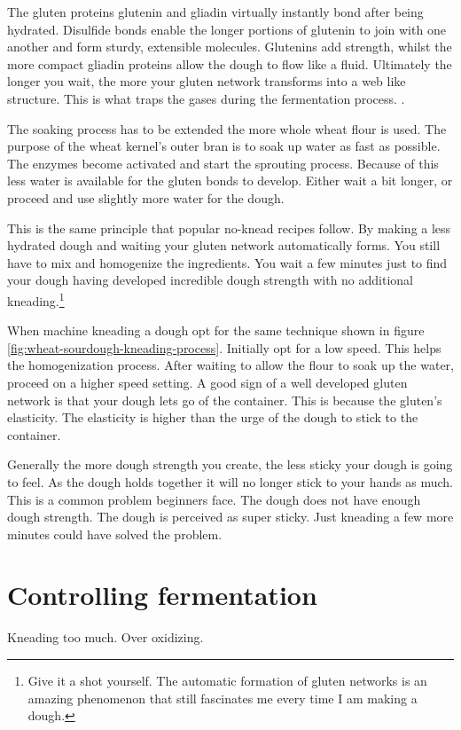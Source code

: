 The gluten proteins glutenin and gliadin virtually instantly bond after being
hydrated. Disulfide bonds enable the longer portions of
glutenin to join with one another and form sturdy, extensible molecules.
Glutenins add strength, whilst the more compact gliadin proteins allow
the dough to flow like a fluid. Ultimately the longer you wait, the more
your gluten network transforms into a web like structure. This is what
traps the gases during the fermentation process. \cite{how+does+gluten+work}.

The soaking process has to be extended the more whole wheat flour is used.
The purpose of the wheat kernel's outer bran is to soak up water as fast
as possible. The enzymes become activated and start the sprouting process.
Because of this less water is available for the gluten bonds to develop.
Either wait a bit longer, or proceed and use slightly more water for
the dough.

This is the same principle that popular no-knead recipes follow. By making a less
hydrated dough and waiting your gluten network automatically forms. You still
have to mix and homogenize the ingredients. You wait a few minutes just to
find your dough having developed incredible dough strength with no additional
kneading.\footnote{Give it a shot yourself. The automatic formation of gluten
networks is an amazing phenomenon that still fascinates me every time I am
making a dough.}

When machine kneading a dough opt for the same technique shown in figure \ref*{fig:wheat-sourdough-kneading-process}.
Initially opt for a low speed. This helps the homogenization process.
After waiting to allow the flour to soak up the water, proceed on a higher speed
setting. A good sign of a well developed gluten network is
that your dough lets go of the container. This is because the gluten's elasticity.
The elasticity is higher than the urge of the
dough to stick to the container.

Generally the more dough strength you create, the less sticky your dough is going to
feel. As the dough holds together it will no longer stick to your hands as
much. This is a common problem beginners face. The dough does not have enough
dough strength. The dough is perceived as super sticky. Just kneading a few
more minutes could have solved the problem.

\section{Controlling fermentation}
Kneading too much.
Over oxidizing.

